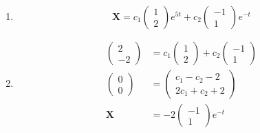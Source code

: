 \documentclass{article}
\begin{document}
\begin{enumerate}
  \item \[\mathbf{X} = c_1 \begin{pmatrix}
            1 \\
            2
          \end{pmatrix} e^{5 t} + c_2 \begin{pmatrix}
            -1 \\
            1
          \end{pmatrix} e^{-t}\]

  \item

        \begin{align*}
          \begin{pmatrix}
            2 \\
            -2
          \end{pmatrix} & = c_1 \begin{pmatrix}
                                  1 \\
                                  2
                                \end{pmatrix} + c_2 \begin{pmatrix}
                                                      -1 \\
                                                      1
                                                    \end{pmatrix} \\
          \begin{pmatrix}
            0 \\
            0
          \end{pmatrix} & = \begin{pmatrix}
                              c_1 - c_2 - 2 \\
                              2 c_1 + c_2 + 2
                            \end{pmatrix}                         \\
          \mathbf{X}      & = -2 \begin{pmatrix}
                                   -1 \\
                                   1
                                 \end{pmatrix} e^{-t}
        \end{align*}
\end{enumerate}

\setcounter{subsubsection}{18}
\subsubsection{}
\end{document}
